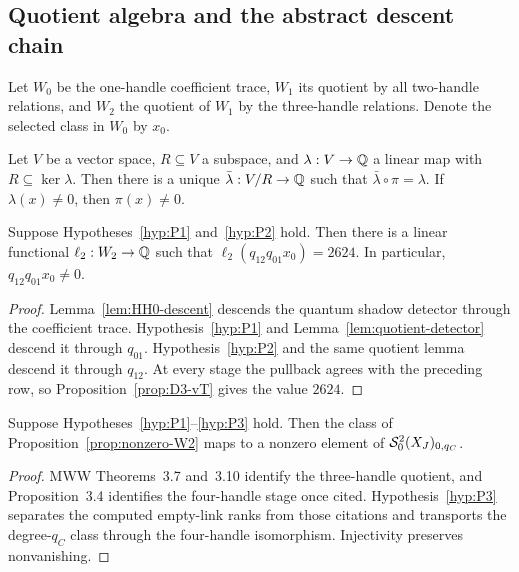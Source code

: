\subsection{Quotient algebra and the abstract descent chain}

Let $W_0$ be the one-handle coefficient trace, $W_1$ its quotient by all
two-handle relations, and $W_2$ the quotient of $W_1$ by the three-handle
relations.  Denote the selected class in $W_0$ by $x_0$.

\begin{lemma}\label{lem:quotient-detector}
Let $V$ be a vector space, $R\subseteq V$ a subspace, and
$\lambda:V\to\mathbb{Q}$ a linear map with $R\subseteq\ker\lambda$.  Then there is a
unique $\bar\lambda:V/R\to\mathbb{Q}$ such that
$\bar\lambda\circ\pi=\lambda$.  If $\lambda(x)\ne0$, then $\pi(x)\ne0$.
\end{lemma}

\begin{proposition}\label{prop:nonzero-W2}
Suppose Hypotheses~\ref{hyp:P1} and~\ref{hyp:P2} hold.  Then there is a
linear functional $\ell_2:W_2\to\mathbb{Q}$ such that
$\ell_2(q_{12}q_{01}x_0)=2624$.  In particular, $q_{12}q_{01}x_0\ne0$.
\end{proposition}

\begin{proof}
Lemma~\ref{lem:HH0-descent} descends the quantum shadow detector through the
coefficient trace.  Hypothesis~\ref{hyp:P1} and
Lemma~\ref{lem:quotient-detector} descend it through $q_{01}$.
Hypothesis~\ref{hyp:P2} and the same quotient lemma descend it through $q_{12}$.
At every stage the pullback agrees with the preceding row, so
Proposition~\ref{prop:D3-vT} gives the value $2624$.
\end{proof}

\begin{proposition}\label{prop:closed-class}
Suppose Hypotheses~\ref{hyp:P1}--\ref{hyp:P3} hold.  Then the class of
Proposition~\ref{prop:nonzero-W2} maps to a nonzero element of
$\mathcal{S}^{2}_{0}(X_J)_{0,q_C}$.
\end{proposition}

\begin{proof}
MWW Theorems~3.7 and~3.10 identify the three-handle quotient, and
Proposition~3.4 identifies the four-handle stage once cited.
Hypothesis~\ref{hyp:P3} separates the computed empty-link ranks from those
citations and transports the degree-$q_C$ class through the four-handle
isomorphism.  Injectivity preserves nonvanishing.
\end{proof}

